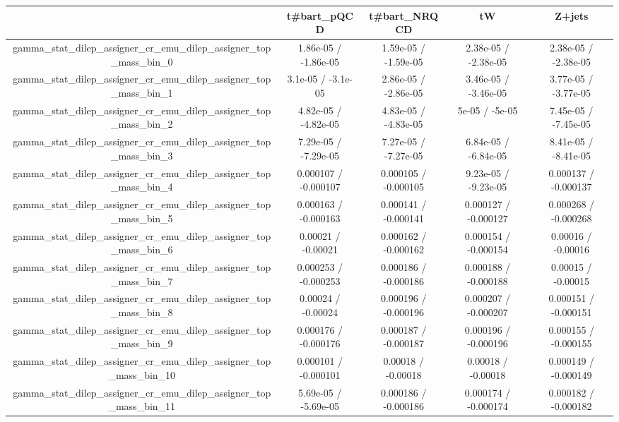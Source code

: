 \documentclass[10pt]{article}
\begin{document}
\begin{table}[htbp]
\begin{center}
\begin{tabular}{|c|c|c|c|c|}
\hline 
      & t#bar{t}_{pQCD}      & t#bar{t}_{NRQCD}      & tW      & Z+jets \\ 
\hline 
  gamma_stat_dilep_assigner_cr_emu_dilep_assigner_top_mass_bin_0 & 1.86e-05 / -1.86e-05 & 1.59e-05 / -1.59e-05 & 2.38e-05 / -2.38e-05 & 2.38e-05 / -2.38e-05 \\ 
  gamma_stat_dilep_assigner_cr_emu_dilep_assigner_top_mass_bin_1 & 3.1e-05 / -3.1e-05 & 2.86e-05 / -2.86e-05 & 3.46e-05 / -3.46e-05 & 3.77e-05 / -3.77e-05 \\ 
  gamma_stat_dilep_assigner_cr_emu_dilep_assigner_top_mass_bin_2 & 4.82e-05 / -4.82e-05 & 4.83e-05 / -4.83e-05 & 5e-05 / -5e-05 & 7.45e-05 / -7.45e-05 \\ 
  gamma_stat_dilep_assigner_cr_emu_dilep_assigner_top_mass_bin_3 & 7.29e-05 / -7.29e-05 & 7.27e-05 / -7.27e-05 & 6.84e-05 / -6.84e-05 & 8.41e-05 / -8.41e-05 \\ 
  gamma_stat_dilep_assigner_cr_emu_dilep_assigner_top_mass_bin_4 & 0.000107 / -0.000107 & 0.000105 / -0.000105 & 9.23e-05 / -9.23e-05 & 0.000137 / -0.000137 \\ 
  gamma_stat_dilep_assigner_cr_emu_dilep_assigner_top_mass_bin_5 & 0.000163 / -0.000163 & 0.000141 / -0.000141 & 0.000127 / -0.000127 & 0.000268 / -0.000268 \\ 
  gamma_stat_dilep_assigner_cr_emu_dilep_assigner_top_mass_bin_6 & 0.00021 / -0.00021 & 0.000162 / -0.000162 & 0.000154 / -0.000154 & 0.00016 / -0.00016 \\ 
  gamma_stat_dilep_assigner_cr_emu_dilep_assigner_top_mass_bin_7 & 0.000253 / -0.000253 & 0.000186 / -0.000186 & 0.000188 / -0.000188 & 0.00015 / -0.00015 \\ 
  gamma_stat_dilep_assigner_cr_emu_dilep_assigner_top_mass_bin_8 & 0.00024 / -0.00024 & 0.000196 / -0.000196 & 0.000207 / -0.000207 & 0.000151 / -0.000151 \\ 
  gamma_stat_dilep_assigner_cr_emu_dilep_assigner_top_mass_bin_9 & 0.000176 / -0.000176 & 0.000187 / -0.000187 & 0.000196 / -0.000196 & 0.000155 / -0.000155 \\ 
  gamma_stat_dilep_assigner_cr_emu_dilep_assigner_top_mass_bin_10 & 0.000101 / -0.000101 & 0.00018 / -0.00018 & 0.00018 / -0.00018 & 0.000149 / -0.000149 \\ 
  gamma_stat_dilep_assigner_cr_emu_dilep_assigner_top_mass_bin_11 & 5.69e-05 / -5.69e-05 & 0.000186 / -0.000186 & 0.000174 / -0.000174 & 0.000182 / -0.000182 \\ 

\end{tabular}
\end{center}
\end{table}
\end{document}
